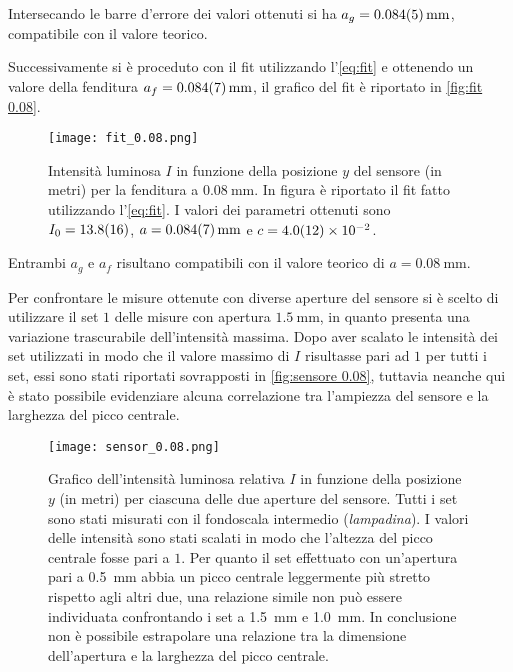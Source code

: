 \documentclass[../main.tex]{subfiles}
\begin{document}
Intersecando le barre d'errore dei valori ottenuti si ha $a_g = \qty{0.084+-0.005}{\mm}$, compatibile con il valore teorico.

\newpage

Successivamente si è proceduto con il fit utilizzando l'\autoref{eq:fit} e ottenendo un valore della fenditura $a_f = \qty{0.084+-0.007}{\mm}$, il grafico del fit è riportato in \autoref{fig:fit 0.08}.

\begin{figure}[ht!]
    \centering
    \texttt{[image: fit\_0.08.png]}
    \caption{Intensità luminosa $I$ in funzione della posizione $y$ del sensore (in metri) per la fenditura a $\qty{0.08}{\mm}$. In figura è riportato il fit fatto utilizzando l'\autoref{eq:fit}. I valori dei parametri ottenuti sono $I_{0} = \num{13.8+-1.6}$, $a = \qty{0.084+-0.007}{\mm}$ e $c = \num{4+-1.2e-2}$.}
    \label{fig:fit 0.08}
\end{figure}

Entrambi $a_g$ e $a_f$ risultano compatibili con il valore teorico di $a = \qty{0.08}{\mm}$.

Per confrontare le misure ottenute con diverse aperture del sensore si è scelto di utilizzare il set $1$ delle misure con apertura $\qty{1.5}{\mm}$, in quanto presenta una variazione trascurabile dell'intensità massima. Dopo aver scalato le intensità dei set utilizzati in modo che il valore massimo di $I$ risultasse pari ad $1$ per tutti i set, essi sono stati riportati sovrapposti in \autoref{fig:sensore 0.08}, tuttavia neanche qui è stato possibile evidenziare alcuna correlazione tra l'ampiezza del sensore e la larghezza del picco centrale.

\begin{figure}[ht!]
    \centering
    \texttt{[image: sensor\_0.08.png]}
    \caption{Grafico dell'intensità luminosa relativa $I$ in funzione della posizione $y$ (in metri) per ciascuna delle due aperture del sensore.
        Tutti i set sono stati misurati con il fondoscala intermedio (\textit{lampadina}). I valori delle intensità sono stati scalati in modo che l'altezza del picco centrale fosse pari a $1$.
        Per quanto il set effettuato con un'apertura pari a \qty{0.5}{\mm} abbia un picco centrale leggermente più stretto rispetto agli altri due, una relazione simile non può essere individuata confrontando i set a \qty{1.5}{\mm} e \qty{1.0}{\mm}. In conclusione non è possibile estrapolare una relazione tra la dimensione dell'apertura e la larghezza del picco centrale.}
    \label{fig:sensore 0.08}
\end{figure}
\end{document}
